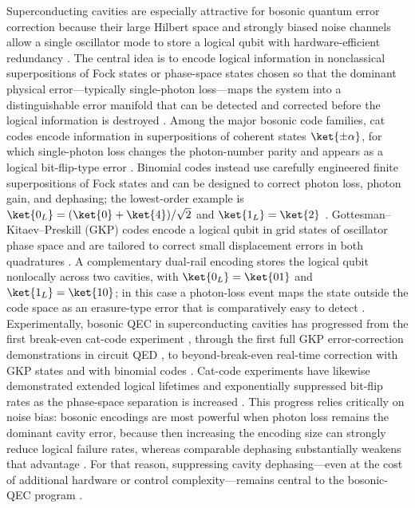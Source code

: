 Superconducting cavities are especially attractive for bosonic quantum error correction because their large Hilbert space and strongly biased noise channels allow a single oscillator mode to store a logical qubit with hardware-efficient redundancy \cite{Cai2021,Copetudo2024}. The central idea is to encode logical information in nonclassical superpositions of Fock states or phase-space states chosen so that the dominant physical error---typically single-photon loss---maps the system into a distinguishable error manifold that can be detected and corrected before the logical information is destroyed \cite{Cai2021,Copetudo2024}. Among the major bosonic code families, cat codes encode information in superpositions of coherent states \(\ket{\pm \alpha}\), for which single-photon loss changes the photon-number parity and appears as a logical bit-flip-type error \cite{Leghtas2013,Mirrahimi2014}. Binomial codes instead use carefully engineered finite superpositions of Fock states and can be designed to correct photon loss, photon gain, and dephasing; the lowest-order example is \(\ket{0_L} = (\ket{0}+\ket{4})/\sqrt{2}\) and \(\ket{1_L} = \ket{2}\) \cite{Michael2016,Albert2018}. Gottesman--Kitaev--Preskill (GKP) codes encode a logical qubit in grid states of oscillator phase space and are tailored to correct small displacement errors in both quadratures \cite{Gottesman2001,Brady2024}. A complementary dual-rail encoding stores the logical qubit nonlocally across two cavities, with \(\ket{0_L}=\ket{01}\) and \(\ket{1_L}=\ket{10}\); in this case a photon-loss event maps the state outside the code space as an erasure-type error that is comparatively easy to detect \cite{Teoh2023,Copetudo2024}. Experimentally, bosonic QEC in superconducting cavities has progressed from the first break-even cat-code experiment \cite{Ofek2016,Cai2021}, through the first full GKP error-correction demonstrations in circuit QED \cite{CampagneIbarcq2020,Brady2024}, to beyond-break-even real-time correction with GKP states \cite{Sivak2023,Brady2024} and with binomial codes \cite{Ni2023,Cai2021}. Cat-code experiments have likewise demonstrated extended logical lifetimes and exponentially suppressed bit-flip rates as the phase-space separation is increased \cite{Gertler2021,Lescanne2020}. This progress relies critically on noise bias: bosonic encodings are most powerful when photon loss remains the dominant cavity error, because then increasing the encoding size can strongly reduce logical failure rates, whereas comparable dephasing substantially weakens that advantage \cite{Albert2018,Leviant2022}. For that reason, suppressing cavity dephasing---even at the cost of additional hardware or control complexity---remains central to the bosonic-QEC program \cite{Cai2021,Leviant2022}.


